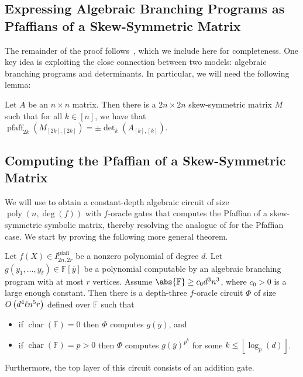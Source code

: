 \documentclass[10pt,a4paper]{amsart}
\DeclareMathOperator{\pfaff}{pfaff}
\DeclareMathOperator{\characteristic}{char}
\DeclareMathOperator{\poly}{poly}
\newcommand*\F{\mathbb{F}}
\newcommand*\floor[1]{%
    \left\lfloor #1 \right\rfloor
}
\newcommand*\bigO[1]{%
    O\kern-0.0pt\left(#1\right)
}
\begin{document}
\subsection{Expressing Algebraic Branching Programs as Pfaffians of a Skew-Symmetric Matrix}

The remainder of the proof follows~\cite{AF21}, which we include here for completeness.
One key idea is exploiting the close connection between two models: algebraic branching programs and determinants.
In particular, we will need the following lemma:

\begin{lem}[{\cite[Lemma 4.3]{AF21}}]\label{lem:skew_symmetrization}
  Let $A$ be an $n\times n$ matrix.
  Then there is a $2n \times 2n$ skew-symmetric matrix $M$ such that for all $k \in [n]$, we have that $\pfaff_{2k}(M_{[2k], [2k]}) = \pm \det_k(A_{[k], [k]})$.
\end{lem}

\subsection{Computing the Pfaffian of a Skew-Symmetric Matrix}

We will use  to obtain a constant-depth algebraic circuit of size $\poly(n,\deg(f))$ with $f$-oracle gates that computes the Pfaffian of a skew-symmetric symbolic matrix, thereby resolving the analogue of  for the Pfaffian case. We start by proving the following more general theorem.

\begin{thrm}\label{thrm:ABP_pfaff_oracle}
    Let $f(X) \in I^{\pfaff}_{2n, 2r}$ be a nonzero polynomial of degree $d$.
    Let $g(y_1, \ldots, y_\ell) \in \F[\overline{y}]$ be a polynomial computable by an algebraic branching program with at most $r$ vertices.
    Assume $\abs{\F} \geq c_0 d^3 n^3$, where $c_0>0$ is a large enough constant.
    Then there is a depth-three $f$-oracle circuit $\Phi$ of size $\bigO{d^4 \ell n^5 r}$ defined over $\F$ such that 
    \begin{itemize}
        \item if $\characteristic(\F) = 0$ then $\Phi$ computes $g(\overline{y})$, and
        \item if $\characteristic(\F) = p > 0$ then $\Phi$ computes $g(\overline{y})^{p^k}$ for some $k \leq \floor{\log_p(d)}$.
    \end{itemize}
    Furthermore, the top layer of this circuit consists of an addition gate.
\end{thrm}
\end{document}
